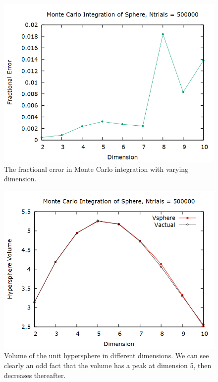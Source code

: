\documentclass[aps,prl,twocolumn,superscriptaddress]{revtex4-1}
\begin{document}
\begin{figure}[htbp]
  	\begin{center}
 		\includegraphics[scale=0.3]{errvdim.png}
  		\caption{The fractional error in Monte Carlo integration with varying dimension.}
  		\label{gr:errvdim}
 	\end{center}
\end{figure}

\begin{figure}[htbp]
  	\begin{center}
 		\includegraphics[scale=0.3]{volvdim.png}
  		\caption{Volume of the unit hypersphere in different dimensions. We can see clearly an odd fact that the volume has a peak at dimension 5, then decreases thereafter.}
  		\label{gr:volvdim}
 	\end{center}
\end{figure}
\end{document}
